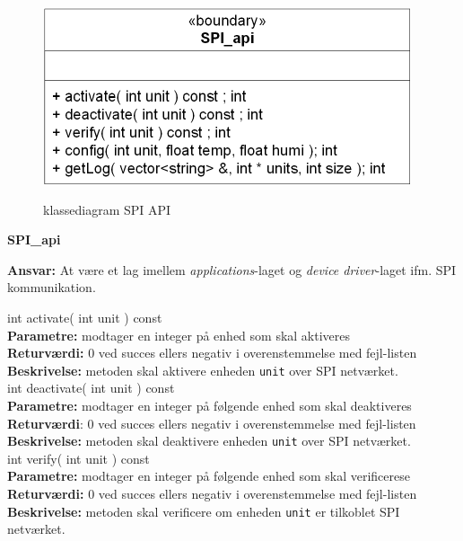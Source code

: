 
\begin{figure}[htbp] \centering
{\includegraphics[scale=1.5]{filer/design/Klassediagrammer/SPI_API}}
\caption{klassediagram SPI API}
\label{fig:SPI API klassediagram}
\end{figure} 

{\centering
\textbf{SPI\_api}\par
}
\textbf{Ansvar:} At være et lag imellem \textit{applications}-laget og \textit{device driver}-laget ifm. SPI kommunikation. \

int activate( int unit ) const \\
\textbf{Parametre:} modtager en integer på enhed som skal aktiveres \\
\textbf{Returværdi:} 0 ved succes ellers negativ i overenstemmelse med fejl-listen \\
\textbf{Beskrivelse:} metoden skal aktivere enheden \verb+unit+ over SPI netværket.\\

int deactivate( int unit ) const \\
\textbf{Parametre:}  modtager en integer på følgende enhed som skal deaktiveres\\
\textbf{Returværdi}: 0 ved succes ellers negativ i overenstemmelse med fejl-listen \\
\textbf{Beskrivelse:} metoden skal deaktivere enheden \verb+unit+ over SPI netværket.\\

int verify( int unit ) const \\
\textbf{Parametre:}  modtager en integer på følgende enhed som skal verificerese\\
\textbf{Returværdi:} 0 ved succes ellers negativ i overenstemmelse med fejl-listen   \\
\textbf{Beskrivelse:} metoden skal verificere om enheden \verb+unit+ er tilkoblet SPI netværket.\\

